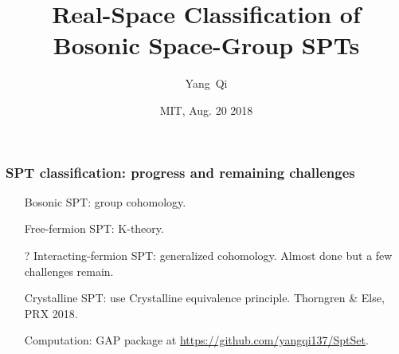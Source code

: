 \documentclass[xcolor=table, 10pt, aspectratio=1610]{beamer}
\title[Space-group SPTs] %
{Real-Space Classification of Bosonic Space-Group SPTs}
\author[Y Qi] %
{Yang~Qi}
\institute[Fudan] %
{Department of Physics, Fudan University}
\date{MIT, Aug. 20 2018}
\begin{document}
\begin{frame}
  \frametitle{SPT classification: progress and remaining challenges}
  \begin{enumerate}
  \item[\ding{51}] Bosonic SPT: group cohomology.
  \item[\ding{51}] Free-fermion SPT: K-theory.
  \item[?] Interacting-fermion SPT: generalized cohomology. Almost done but a few challenges remain.
  \item[\ding{51}] Crystalline SPT: use Crystalline equivalence principle. Thorngren \& Else, PRX 2018.
  \item[\ding{51}] Computation: GAP package at \url{https://github.com/yangqi137/SptSet}.
  \end{enumerate}
\end{frame}
\end{document}
